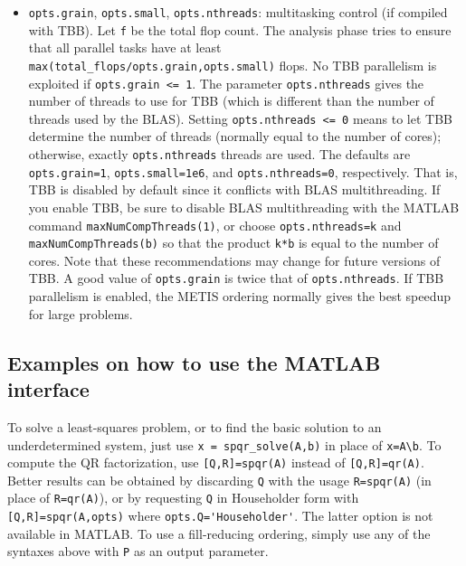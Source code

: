\documentclass[12pt]{article}
\begin{document}
\begin{itemize}
    \item \verb'opts.grain', \verb'opts.small', \verb'opts.nthreads':
    multitasking control (if compiled with TBB).  Let \verb'f' be the total
    flop count.  The analysis phase tries to ensure that all parallel tasks
    have at least \verb'max(total_flops/opts.grain,opts.small)' flops.  No TBB
    parallelism is exploited if \verb'opts.grain <= 1'.  The parameter
    \verb'opts.nthreads' gives the number of threads to use for TBB (which is
    different than the number of threads used by the BLAS).  Setting
    \verb'opts.nthreads <= 0' means to let TBB determine the number of threads
    (normally equal to the number of cores); otherwise, exactly
    \verb'opts.nthreads' threads are used.  The defaults are
    \verb'opts.grain=1', \verb'opts.small=1e6', and \verb'opts.nthreads=0',
    respectively.  That is, TBB is disabled by default since it conflicts with
    BLAS multithreading.  If you enable TBB, be sure to disable BLAS
    multithreading with the MATLAB command \verb'maxNumCompThreads(1)', or
    choose \newline \verb'opts.nthreads=k' and \verb'maxNumCompThreads(b)' so
    that the product \verb'k*b' is equal to the number of cores.  Note that
    these recommendations may change for future versions of TBB.  A good value
    of \verb'opts.grain' is twice that of \verb'opts.nthreads'.  If TBB
    parallelism is enabled, the METIS ordering normally gives the best speedup
    for large problems.

\end{itemize}

\subsection{Examples on how to use the MATLAB interface}

To solve a least-squares problem, or to find the basic solution to an
underdetermined system, just use \verb'x = spqr_solve(A,b)' in place of
\verb'x=A\b'.  To compute the QR factorization, use \verb'[Q,R]=spqr(A)'
instead of \verb'[Q,R]=qr(A)'.  Better results can be obtained by discarding
\verb'Q' with the usage \verb'R=spqr(A)' (in place of \verb'R=qr(A)'), or by
requesting \verb'Q' in Householder form with \verb'[Q,R]=spqr(A,opts)' where
\verb"opts.Q='Householder'".  The latter option is not available in MATLAB.  To
use a fill-reducing ordering, simply use any of the syntaxes above with
\verb'P' as an output parameter.
\end{document}
